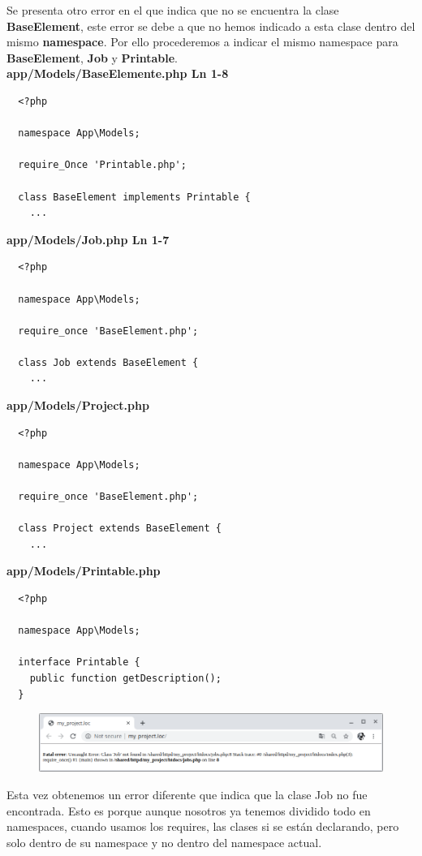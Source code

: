 \documentclass{article}
\begin{document}
Se presenta otro error en el que indica que no se encuentra la clase
\textbf{BaseElement}, este error se debe a que no hemos indicado a esta clase
dentro del mismo \textbf{namespace}. Por ello procederemos a indicar el mismo
namespace para \textbf{BaseElement}, \textbf{Job} y \textbf{Printable}.\\

\textbf{app/Models/BaseElemente.php Ln 1-8}
\begin{verbatim}
  <?php

  namespace App\Models;

  require_Once 'Printable.php';

  class BaseElement implements Printable {
    ...
\end{verbatim}

\textbf{app/Models/Job.php Ln 1-7}
\begin{verbatim}
  <?php

  namespace App\Models;

  require_once 'BaseElement.php';

  class Job extends BaseElement {
    ...
\end{verbatim}

\textbf{app/Models/Project.php}
\begin{verbatim}
  <?php

  namespace App\Models;

  require_once 'BaseElement.php';

  class Project extends BaseElement {
    ...
\end{verbatim}

\textbf{app/Models/Printable.php}
\begin{verbatim}
  <?php

  namespace App\Models;

  interface Printable {
    public function getDescription();
  }
\end{verbatim}

\begin{figure}[h!]
  \centering
  \includegraphics[scale=0.5]{./Pictures/052_namespaces.png}
\end{figure}

Esta vez obtenemos un error diferente que indica que la clase Job no fue
encontrada. Esto es porque aunque nosotros ya tenemos dividido todo en
namespaces, cuando usamos los requires, las clases si se están declarando, pero
solo dentro de su namespace y no dentro del namespace actual.\\
\end{document}
